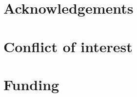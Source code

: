






\section*{Acknowledgements}\label{sec:acknowledgements}


\section*{Conflict of interest}\label{sec:conflict-of-interest}


\section*{Funding}\label{sec:funding}


